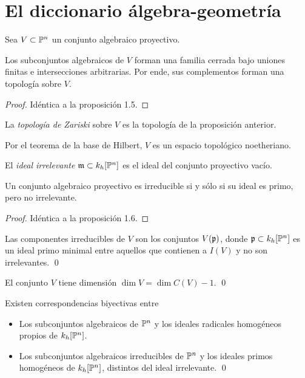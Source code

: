 \section{El diccionario álgebra-geometría}

\begin{preliminaries}
Sea $V \subset \P^n$ un conjunto algebraico proyectivo.
\end{preliminaries}

\begin{proposition}
Los subconjuntos algebraicos de $V$ forman una familia cerrada bajo uniones finitas e intersecciones arbitrarias. Por ende, sus complementos forman una topología sobre $V$.
\end{proposition}

\begin{proof}
Idéntica a la proposición 1.5.
\end{proof}

\begin{definition}
La \textit{topología de Zariski} sobre $V$ es la topología de la proposición anterior.
\end{definition}

\begin{remark}
Por el teorema de la base de Hilbert, $V$ es un espacio topológico noetheriano.
\end{remark}

\begin{definition}
El \textit{ideal irrelevante} $\m \subset k_h[\P^n]$ es el ideal del conjunto proyectivo vacío.
\end{definition}

\begin{proposition}
Un conjunto algebraico proyectivo es irreducible si y sólo si su ideal es primo, pero no irrelevante.
\end{proposition}

\begin{proof}
Idéntica a la proposición 1.6.
\end{proof}

\begin{corollary}
Las componentes irreducibles de $V$ son los conjuntos $V(\p)$, donde $\p \subset k_h[\P^n]$ es un ideal primo minimal entre aquellos que contienen a $I(V)$ y no son irrelevantes. \qed
\end{corollary}

\begin{corollary}
El conjunto $V$ tiene dimensión $\dim V = \dim C(V) - 1$. \qed
\end{corollary}

\begin{corollary}
Existen correspondencias biyectivas entre

\begin{itemize}
    \item Los subconjuntos algebraicos de $\P^n$ y los ideales radicales homogéneos propios de $k_h[\P^n]$.
    \item Los subconjuntos algebraicos irreducibles de $\P^n$ y los ideales primos homogéneos de $k_h[\P^n]$, distintos del ideal irrelevante. \qed
\end{itemize}
\end{corollary}

